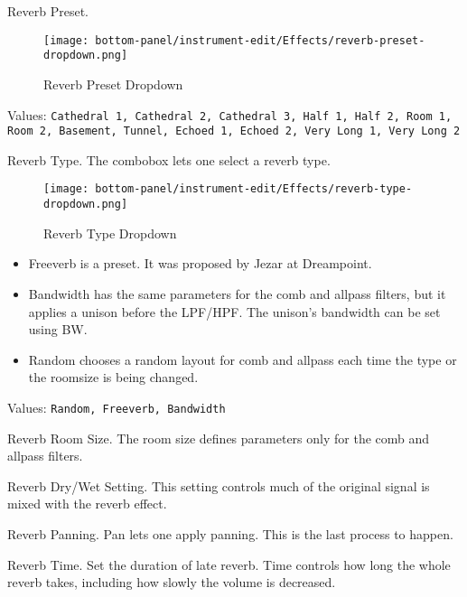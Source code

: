       Reverb Preset.

\begin{figure}[H]
   \centering
   \texttt{[image: bottom-panel/instrument-edit/Effects/reverb-preset-dropdown.png]}
   \caption{Reverb Preset Dropdown}
   \label{fig:reverb_preset_dropdown}
\end{figure}

   Values: \texttt{Cathedral 1, Cathedral 2, Cathedral 3, Half 1, Half 2,
              Room 1, Room 2, Basement, Tunnel, Echoed 1, Echoed 2, Very Long
               1, Very Long 2}

   Reverb Type.
   The combobox lets one select a reverb type.

\begin{figure}[H]
   \centering
   \texttt{[image: bottom-panel/instrument-edit/Effects/reverb-type-dropdown.png]}
   \caption{Reverb Type Dropdown}
   \label{fig:reverb_type_dropdown}
\end{figure}

   \begin{itemize}
      \item Freeverb is a preset. It was proposed by Jezar at Dreampoint.
      \item Bandwidth has the same parameters for the comb and allpass
         filters, but it applies a unison before the LPF/HPF. The unison’s
         bandwidth can be set using BW.
      \item Random chooses a random layout for comb and allpass each time the
         type or the roomsize is being changed.
   \end{itemize}

   Values: \texttt{Random, Freeverb, Bandwidth}

   Reverb Room Size.
   The room size defines parameters only for the comb and allpass filters.

   Reverb Dry/Wet Setting.
   This setting controls much of the original signal is mixed with the
   reverb effect.

   Reverb Panning.
   Pan lets one apply panning. This is the last process to happen.

   Reverb Time.
   Set the duration of late reverb.
   Time controls how long the whole reverb takes, including how slowly
   the volume is decreased.

